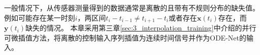 一般情况下，从传感器测量得到的数据通常是离散的且带有不规则分布的缺失值。例如可能存在某一时刻$i$，两区间$t_i-t_{i-1} \neq t_{i+1}-t_{i}$或者存在$\boldsymbol x(t_i)$存在，而$\boldsymbol y(t_i)$缺失的情况。
本章采用第三章\ref{sec:3_interpolation_training}中介绍的并行可微插值方法，将离散的控制输入序列插值为连续时间信号并作为ODE-Net的输入。



